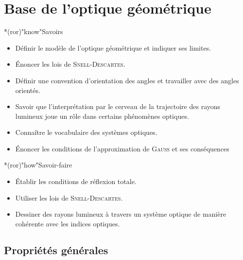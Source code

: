 \documentclass[../../main/main.tex]{subfiles}
\begin{document}
\setcounter{chapter}{1}

\chapter{Base de l'optique g\'eom\'etrique}

\begin{prgm}
	\begin{tcb}*(ror)"know"{Savoirs}
		\begin{itemize}[label=$\diamond$, leftmargin=10pt]
			\item Définir le modèle de l'optique géométrique et indiquer ses limites.
			\item Énoncer les lois de \textsc{Snell-Descartes}.
			\item Définir une convention d'orientation des angles et travailler avec
			      des angles orientés.
			\item Savoir que l'interprétation par le cerveau de la trajectoire des
			      rayons lumineux joue un rôle dans certains phénomènes optiques.
			\item Connaître le vocabulaire des systèmes optiques.
			\item Énoncer les conditions de l'approximation de \textsc{Gauss} et ses
			      conséquences
		\end{itemize}
	\end{tcb}

	\begin{tcb}*(ror)"how"{Savoir-faire}
		\begin{itemize}[label=$\diamond$, leftmargin=10pt]
			\item Établir les conditions de réflexion totale.
			\item Utiliser les lois de \textsc{Snell-Descartes}.
			\item Dessiner des rayons lumineux à travers un système optique de manière
			      cohérente avec les indices optiques.
		\end{itemize}
	\end{tcb}
\end{prgm}

\section{Propriétés générales}
\end{document}
